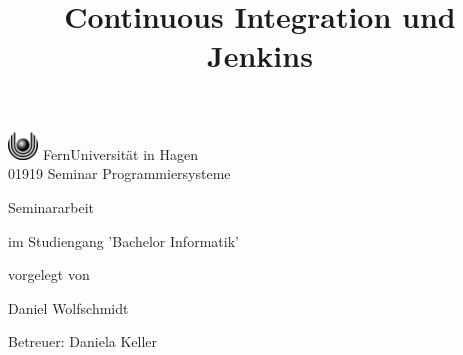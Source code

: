 \documentclass[german,11pt,a4paper]{report} %
\begin{document}
\begin{huge}
\begin{center}
       \includegraphics[width=0.8cm]{./logo/logo.eps} FernUniversität in Hagen\\
				01919 Seminar Programmiersysteme
    \end{center}
\end{huge}

\vspace{3cm}


\title{\Huge Continuous Integration und Jenkins}
\date{\vspace{-5ex}}
{\let\newpage\relax\maketitle}
\thispagestyle{empty}


\begin{center}
\begin{large}
\begin{Large}
Seminararbeit\\
\end{Large}
im Studiengang 'Bachelor Informatik' \\
\end{large}
\end{center}
\begin{center}
vorgelegt von\\
\begin{large}
Daniel Wolfschmidt\\
\end{large}
\end{center}
\vspace{1cm}
\begin{center}
\begin{large}
Betreuer: Daniela Keller\\
\end{large}
\end{center}
\end{document}
